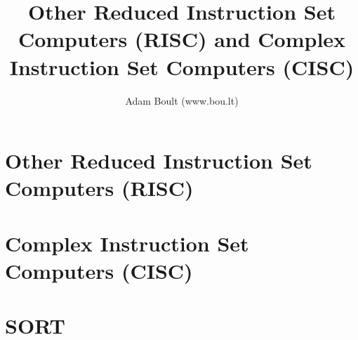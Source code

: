 \documentclass[oneside]{book}
\begin{document}
\author{Adam Boult (www.bou.lt)}
\title{Other Reduced Instruction Set Computers (RISC) and Complex Instruction Set Computers (CISC)}
\maketitle

\setcounter{tocdepth}{0}
\tableofcontents



\part{Other Reduced Instruction Set Computers (RISC)}








\part{Complex Instruction Set Computers (CISC)}







\part{SORT}

\end{document}
